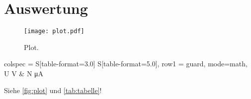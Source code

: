 \section{Auswertung}
\label{sec:Auswertung}

\begin{figure}
  \centering
  \texttt{[image: plot.pdf]}
  \caption{Plot.}
  \label{fig:plot}
\end{figure}

\begin{table}
  \centering
  \caption{}
  \label{tab:tabelle}
  \begin{tblr}{
      colspec = {S[table-format=3.0] S[table-format=5.0]},
      row{1} = {guard, mode=math},
    }
    \toprule
    U \mathbin{/} \unit{\volt} & N \mathbin{/} \unit{\micro\ampere} \\
    \midrule

    \bottomrule
  \end{tblr}
\end{table}

Siehe \autoref{fig:plot} und \autoref{tab:tabelle}!
